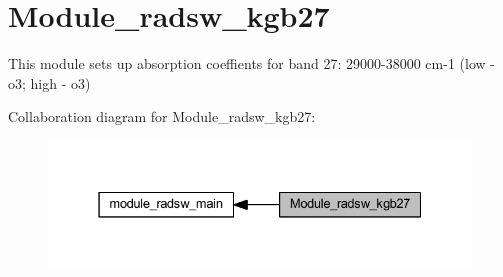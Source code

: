 \hypertarget{group__module__radsw__kgb27}{}\section{Module\+\_\+radsw\+\_\+kgb27}
\label{group__module__radsw__kgb27}


This module sets up absorption coeffients for band 27\+: 29000-\/38000 cm-\/1 (low -\/ o3; high -\/ o3)  


Collaboration diagram for Module\+\_\+radsw\+\_\+kgb27\+:\nopagebreak
\begin{figure}[H]
\begin{center}
\leavevmode
\includegraphics[width=331pt]{group__module__radsw__kgb27}
\end{center}
\end{figure}
